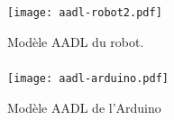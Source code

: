 \documentclass{beamer}
\begin{document}
      \begin{frame}
        \frametitle{\secname}        
        \framesubtitle{\subsecname}

        \begin{figure}
          \centering
          \texttt{[image: aadl-robot2.pdf]}
          \caption{Modèle AADL du robot.}
        \end{figure}
      \end{frame}

%

      \begin{frame}
        \frametitle{\secname}        
        \framesubtitle{\subsecname}

        \begin{figure}
          \centering
          \texttt{[image: aadl-arduino.pdf]}
          \caption{Modèle AADL de l'Arduino}
        \end{figure}
      \end{frame}
\end{document}
